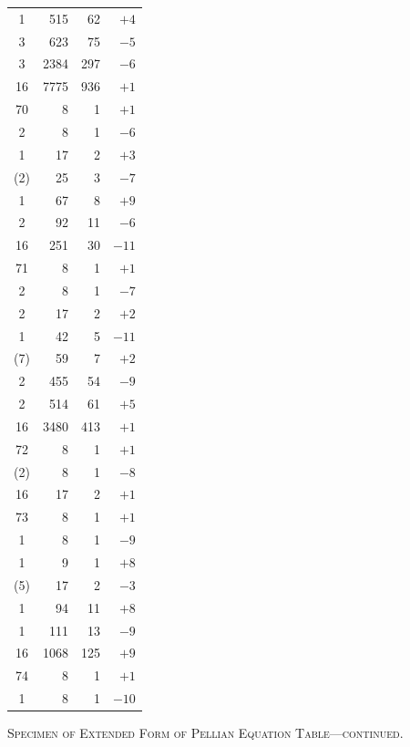 \documentclass[11pt]{article}
\begin{document}
\begin{center}
\begin{tabular}{|c|r|r|r|}
1 & 515 & 62 & $+4$ \\
3 & 623 & 75 & $-5$ \\
3 & 2384 & 297 & $-6$ \\
16 & 7775 & 936 & $+1$ \\
\hline
70 & 8 & 1 & $+1$ \\
2 & 8 & 1 & $-6$ \\
1 & 17 & 2 & $+3$ \\
(2) & 25 & 3 & $-7$ \\
1 & 67 & 8 & $+9$ \\
2 & 92 & 11 & $-6$ \\
16 & 251 & 30 & $-11$ \\
\hline
71 & 8 & 1 & $+1$ \\
2 & 8 & 1 & $-7$ \\
2 & 17 & 2 & $+2$ \\
1 & 42 & 5 & $-11$ \\
(7) & 59 & 7 & $+2$ \\
2 & 455 & 54 & $-9$ \\
2 & 514 & 61 & $+5$ \\
16 & 3480 & 413 & $+1$ \\
\hline
72 & 8 & 1 & $+1$ \\
(2) & 8 & 1 & $-8$ \\
16 & 17 & 2 & $+1$ \\
\hline
73 & 8 & 1 & $+1$ \\
1 & 8 & 1 & $-9$ \\
1 & 9 & 1 & $+8$ \\
(5) & 17 & 2 & $-3$ \\
1 & 94 & 11 & $+8$ \\
1 & 111 & 13 & $-9$ \\
16 & 1068 & 125 & $+9$ \\
\hline
74 & 8 & 1 & $+1$ \\
1 & 8 & 1 & $-10$ \\
\hline
\end{tabular}
\end{center}
\begin{center}
\small\textsc{Specimen of Extended Form of Pellian Equation Table---continued.}
\end{center}
\end{document}
